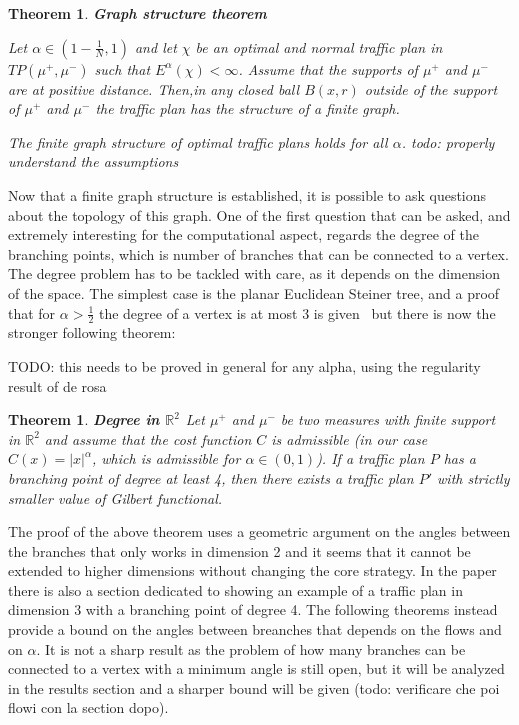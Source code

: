 \documentclass[12pt,a4paper]{article}
\numberwithin{equation}{section}
\theoremstyle{mytheorem}
\newtheorem{theorem}[subsection]{Theorem}
\theoremstyle{myremark}
\theoremstyle{myparagraph}
\newcommand{\R}{\mathbb{R}}
\begin{document}
    \begin{theorem}
        \textbf{Graph structure theorem \cite[Lemma 8.14]{Bernot}}
    
        Let $\alpha \in \left( 1-\frac{1}{N}, 1 \right)$ and let $\chi$ be an optimal and normal traffic
        plan in $TP(\mu^+, \mu^-)$ such that $E^\alpha(\chi) < \infty$. Assume that the supports
        of $\mu^+$ and $\mu^-$ are at positive distance. Then,in any closed ball $B(x, r)$ outside
        of the support of $\mu^+$ and $\mu^-$ the traffic plan has the structure of a finite graph.

        \cite[Theorem ?]{well_posedness}
        The finite graph structure of optimal traffic plans holds for all $\alpha$.
        todo: properly understand the assumptions 
    \end{theorem}

    Now that a finite graph structure is established, it is possible to ask questions about the topology of this graph.
    One of the first question that can be asked, and extremely interesting for the computational aspect, regards the degree of the branching points, which is number of branches that can be connected to a vertex.
    The degree problem has to be tackled with care, as it depends on the dimension of the space. The simplest case is the planar Euclidean Steiner tree, and a proof 
    that for $\alpha > \frac{1}{2}$ the degree of a vertex is at most 3 is given~\cite{Bernot} but there is now the stronger following theorem:

    TODO: this needs to be proved in general for any alpha, using the regularity result of de rosa

    \begin{theorem}
        \textbf{Degree in $\R^2$ \cite[Theorem 3]{degree3}}
        Let $\mu^+$ and $\mu^-$ be two measures with finite support in $\R^2$ and assume that the cost
        function $C$ is admissible (in our case $C(x) = |x|^\alpha$, which is admissible for $\alpha \in (0,1)$).
        If a traffic plan $P$ has a branching point of degree at least 4, then there exists
        a traffic plan $P'$ with strictly smaller value of Gilbert functional.
    \end{theorem}

    The proof of the above theorem uses a geometric argument on the angles between the branches that only works in dimension 2 and it seems
    that it cannot be extended to higher dimensions without changing the core strategy. In the paper there is also a section dedicated
    to showing an example of a traffic plan in dimension 3 with a branching point of degree 4.
    The following theorems instead provide a bound on the angles between breanches that depends on the flows and on $\alpha$. It 
    is not a sharp result as the problem of how many branches can be connected to a vertex with a minimum angle is still open, but it will
    be analyzed in the results section and a sharper bound will be given (todo: verificare che poi flowi con la section dopo).
    
\end{document}
